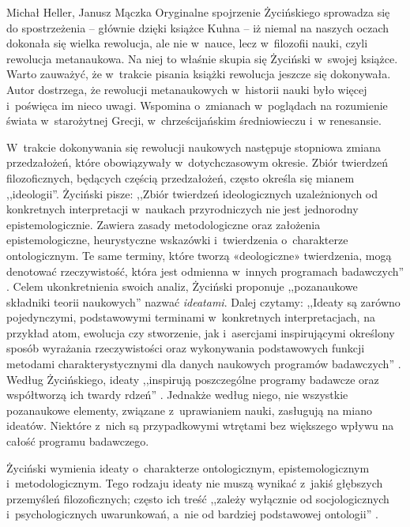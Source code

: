 \begin{newrevplenv2auth}{Michał Heller, Janusz Mączka}
Oryginalne spojrzenie Życińskiego sprowadza się do spostrzeżenia -- głównie dzięki książce Kuhna -- iż niemal na naszych oczach dokonała się wielka rewolucja, ale nie w~nauce, lecz w~filozofii nauki, czyli rewolucja metanaukowa. Na niej to właśnie skupia się Życiński w~swojej książce. Warto zauważyć, że w~trakcie pisania książki rewolucja jeszcze się dokonywała. Autor dostrzega, że rewolucji metanaukowych w~historii nauki było więcej i~poświęca im nieco uwagi. Wspomina o~zmianach w~poglądach na rozumienie świata w~starożytnej Grecji, w~chrześcijańskim średniowieczu i~w renesansie.

W~trakcie dokonywania się rewolucji naukowych następuje stopniowa zmiana przedzałożeń, które obowiązywały w~dotychczasowym okresie. Zbiór twierdzeń filozoficznych, będących częścią przedzałożeń, często określa się mianem ,,ideologii''. Życiński pisze: ,,Zbiór twierdzeń ideologicznych uzależnionych od konkretnych interpretacji w~naukach przyrodniczych nie jest jednorodny epistemologicznie. Zawiera zasady metodologiczne oraz założenia epistemologiczne, heurystyczne wskazówki i~twierdzenia o~charakterze ontologicznym. Te same terminy, które tworzą «deologiczne» twierdzenia, mogą denotować rzeczywistość, która jest odmienna w~innych programach badawczych''
\parencite[][s.~33]{zycinski_struktura_2013}. %
 Celem ukonkretnienia swoich analiz, Życiński proponuje ,,pozanaukowe składniki teorii naukowych'' nazwać \textit{ideatami}. Dalej czytamy: ,,Ideaty są zarówno pojedynczymi, podstawowymi terminami w~konkretnych interpretacjach, na przykład atom, ewolucja czy stworzenie, jak i~asercjami inspirującymi określony sposób wyrażania rzeczywistości oraz wykonywania podstawowych funkcji metodami charakterystycznymi dla danych naukowych programów badawczych'' 
\parencite[][s.~34]{zycinski_struktura_2013}. %
 Według Życińskiego, ideaty ,,inspirują poszczególne programy badawcze oraz współtworzą ich twardy rdzeń'' 
\parencite[][s.~34]{zycinski_struktura_2013}. %
 Jednakże według niego, nie wszystkie pozanaukowe elementy, związane z~uprawianiem nauki, zasługują na miano ideatów. Niektóre z~nich są przypadkowymi wtrętami bez większego wpływu na całość programu badawczego.

Życiński wymienia ideaty o~charakterze ontologicznym, epistemologicznym i~metodologicznym. Tego rodzaju ideaty nie muszą wynikać z~jakiś głębszych przemyśleń filozoficznych; często ich treść ,,zależy wyłącznie od socjologicznych i~psychologicznych uwarunkowań, a~nie od bardziej podstawowej ontologii''
\parencite[][s.~51]{zycinski_struktura_2013}.%



\end{newrevplenv2auth}
